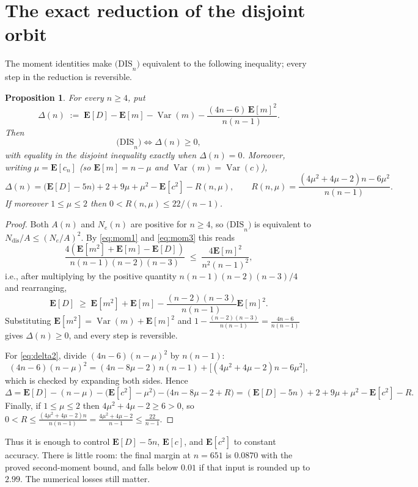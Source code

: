 \documentclass[11pt,a4paper]{amsart}
\theoremstyle{plain}
\newtheorem{proposition}[theorem]{Proposition}
\theoremstyle{definition}
\newcommand{\EX}{\mathbf{E}}
\newcommand{\Var}{\operatorname{Var}}
\newcommand{\Nc}{N}
\newcommand{\DIS}{\mathrm{(DIS}_n\mathrm{)}}
\begin{document}
\section{The exact reduction of the disjoint orbit}\label{sec:delta}

The moment identities make $\DIS$ equivalent to the following inequality; every
step in the reduction is reversible.

\begin{proposition}\label{prop:delta}
For every $n \ge 4$, put
\[
  \Delta(n) \;:=\; \EX[D] - \EX[m] - \Var(m)
                   - \frac{(4n-6)\,\EX[m]^2}{n(n-1)} .
\]
Then
\[
  \DIS \iff \Delta(n) \ge 0 ,
\]
with equality in the disjoint inequality exactly when $\Delta(n)=0$.
Moreover, writing $\mu = \EX[c_n]$ (so $\EX[m]=n-\mu$ and $\Var(m)=\Var(c)$),
\begin{equation}\label{eq:delta2}
  \Delta(n) = \big(\EX[D]-5n\big) + 2 + 9\mu + \mu^2 - \EX[c^2] - R(n,\mu),
  \qquad
  R(n,\mu) = \frac{(4\mu^2+4\mu-2)n-6\mu^2}{n(n-1)} .
\end{equation}
If moreover $1 \le \mu \le 2$ then $0 < R(n,\mu) \le 22/(n-1)$.
\end{proposition}

\begin{proof}
Both $A(n)$ and $\Nc_e(n)$ are positive for $n \ge 4$, so $\DIS$ is equivalent to
$\Nc_{\mathrm{dis}}/A \le (\Nc_e/A)^2$. By \eqref{eq:mom1} and \eqref{eq:mom3}
this reads
\[
  \frac{4(\EX[m^2]+\EX[m]-\EX[D])}{n(n-1)(n-2)(n-3)}
  \;\le\; \frac{4\EX[m]^2}{n^2(n-1)^2},
\]
i.e., after multiplying by the positive quantity $n(n-1)(n-2)(n-3)/4$ and
rearranging,
\[
  \EX[D] \;\ge\; \EX[m^2]+\EX[m] - \frac{(n-2)(n-3)}{n(n-1)}\EX[m]^2 .
\]
Substituting $\EX[m^2]=\Var(m)+\EX[m]^2$ and
$1-\frac{(n-2)(n-3)}{n(n-1)} = \frac{4n-6}{n(n-1)}$ gives
$\Delta(n)\ge 0$, and every step is reversible.

For \eqref{eq:delta2}, divide $(4n-6)(n-\mu)^2$ by $n(n-1)$:
\[
  (4n-6)(n-\mu)^2 = (4n-8\mu-2)\,n(n-1) + \big[(4\mu^2+4\mu-2)n-6\mu^2\big],
\]
which is checked by expanding both sides. Hence
\[
  \Delta = \EX[D]-(n-\mu)-\big(\EX[c^2]-\mu^2\big)-\big(4n-8\mu-2+R\big)
         = (\EX[D]-5n)+2+9\mu+\mu^2-\EX[c^2]-R .
\]
Finally, if $1 \le \mu \le 2$ then $4\mu^2+4\mu-2 \ge 6 > 0$, so
$0 < R \le \frac{(4\mu^2+4\mu-2)n}{n(n-1)} = \frac{4\mu^2+4\mu-2}{n-1}
 \le \frac{22}{n-1}$.
\end{proof}

Thus it is enough to control $\EX[D]-5n$, $\EX[c]$, and $\EX[c^2]$ to constant
accuracy. There is little room: the final margin at $n=651$ is $0.0870$ with
the proved second-moment bound, and falls below $0.01$ if that input is rounded
up to $2.99$. The numerical losses still matter.
\end{document}
